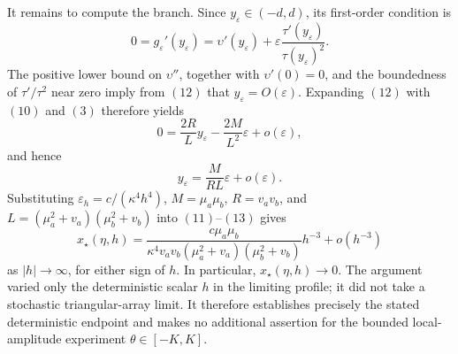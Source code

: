 It remains to compute the branch.  Since \(y_{\varepsilon}\in(-d,d)\), its first-order condition is
\[
 0=g_\varepsilon'(y_\varepsilon)
 =\upsilon'(y_\varepsilon)
  +\varepsilon\frac{\tau'(y_\varepsilon)}{\tau(y_\varepsilon)^2}. \tag{12}
\]
The positive lower bound on \(\upsilon''\), together with \(\upsilon'(0)=0\), and the boundedness of \(\tau'/\tau^2\) near zero imply from \((12)\) that \(y_\varepsilon=O(\varepsilon)\).  Expanding \((12)\) with \((10)\) and \((3)\) therefore yields
\[
 0=\frac{2R}{L}y_\varepsilon
   -\frac{2M}{L^2}\varepsilon+o(\varepsilon),
\]
and hence
\[
 y_\varepsilon=\frac{M}{RL}\varepsilon+o(\varepsilon).            \tag{13}
\]
Substituting \(\varepsilon_h=c/(\kappa^4h^4)\), \(M=\mu_a\mu_b\), \(R=v_av_b\), and \(L=(\mu_a^2+v_a)(\mu_b^2+v_b)\) into \((11)\)--\((13)\) gives
\[
 x_\star(\eta,h)
 =\frac{c\mu_a\mu_b}
 {\kappa^4v_av_b(\mu_a^2+v_a)(\mu_b^2+v_b)}h^{-3}
 +o(h^{-3})
\]
as \(|h|\to\infty\), for either sign of \(h\).  In particular, \(x_\star(\eta,h)\to0\).  The argument varied only the deterministic scalar \(h\) in the limiting profile; it did not take a stochastic triangular-array limit.  It therefore establishes precisely the stated deterministic endpoint and makes no additional assertion for the bounded local-amplitude experiment \(\theta\in[-K,K]\).
